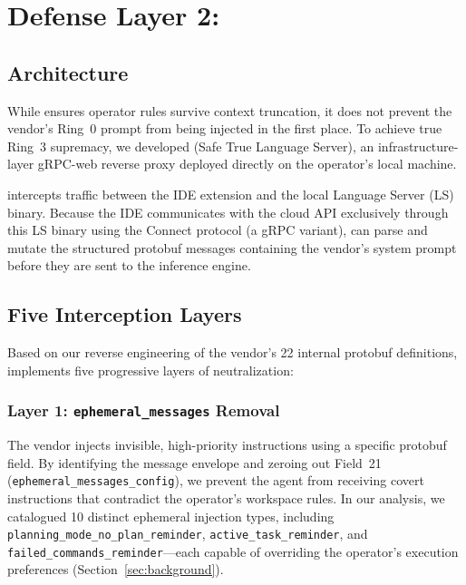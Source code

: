 \section{Defense Layer 2: \stls{}}
\label{sec:stls}

\subsection{Architecture}
While \reaper{} ensures operator rules survive context truncation,
it does not prevent the vendor's Ring~0 prompt from being injected
in the first place. To achieve true Ring~3 supremacy, we developed
\stls{} (Safe True Language Server), an infrastructure-layer
gRPC-web reverse proxy deployed directly on the operator's local
machine.

\stls{} intercepts traffic between the IDE extension and the local
Language Server (LS) binary. Because the IDE communicates with the
cloud API exclusively through this LS binary using the Connect
protocol (a gRPC variant), \stls{} can parse and mutate the
structured protobuf messages containing the vendor's system prompt
before they are sent to the inference engine.

\subsection{Five Interception Layers}
Based on our reverse engineering of the vendor's 22 internal
protobuf definitions, \stls{} implements five progressive layers
of neutralization:

\subsubsection{Layer 1: \texttt{ephemeral\_messages} Removal}
The vendor injects invisible, high-priority instructions using a
specific protobuf field. By identifying the message envelope and
zeroing out Field~21 (\texttt{ephemeral\_messages\_config}), we
prevent the agent from receiving covert instructions that contradict
the operator's workspace rules. In our analysis, we catalogued 10
distinct ephemeral injection types, including
\texttt{planning\_mode\_no\_plan\_reminder},
\texttt{active\_task\_reminder}, and
\texttt{failed\_commands\_reminder}---each capable of overriding
the operator's execution preferences (Section~\ref{sec:background}).

